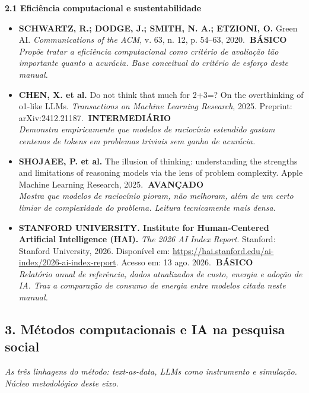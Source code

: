 \documentclass[11pt,a4paper]{article}
\newcommand{\refc}[2]{\item #1\\{\footnotesize\color{cinzaescuro}\textit{#2}}}
\newcommand{\nivelbasico}{\hfill\colorbox{verdeCodigo}{\color{white}\scriptsize\poppinsmed\textbf{~BÁSICO~}}}
\newcommand{\nivelinterm}{\hfill\colorbox{amareloSol}{\color{black}\scriptsize\poppinsmed\textbf{~INTERMEDIÁRIO~}}}
\newcommand{\nivelavancado}{\hfill\colorbox{laranjaDestaque}{\color{white}\scriptsize\poppinsmed\textbf{~AVANÇADO~}}}
\begin{document}
\textbf{\poppinsmed\color{azulUNIclaro}2.1 Eficiência computacional e sustentabilidade}
\begin{itemize}[leftmargin=1.4em,label={}]
\refc{\textbf{SCHWARTZ, R.; DODGE, J.; SMITH, N. A.; ETZIONI, O.} Green AI. \textit{Communications of the ACM}, v. 63, n. 12, p. 54--63, 2020.\nivelbasico}{Propõe tratar a eficiência computacional como critério de avaliação tão importante quanto a acurácia. Base conceitual do critério de esforço deste manual.}
\refc{\textbf{CHEN, X. et al.} Do not think that much for 2+3=? On the overthinking of o1-like LLMs. \textit{Transactions on Machine Learning Research}, 2025. Preprint: arXiv:2412.21187.\nivelinterm}{Demonstra empiricamente que modelos de raciocínio estendido gastam centenas de tokens em problemas triviais sem ganho de acurácia.}
\refc{\textbf{SHOJAEE, P. et al.} The illusion of thinking: understanding the strengths and limitations of reasoning models via the lens of problem complexity. Apple Machine Learning Research, 2025.\nivelavancado}{Mostra que modelos de raciocínio pioram, não melhoram, além de um certo limiar de complexidade do problema. Leitura tecnicamente mais densa.}
\refc{\textbf{STANFORD UNIVERSITY. Institute for Human-Centered Artificial Intelligence (HAI).} \textit{The 2026 AI Index Report}. Stanford: Stanford University, 2026. Disponível em: \url{https://hai.stanford.edu/ai-index/2026-ai-index-report}. Acesso em: 13 ago. 2026.\nivelbasico}{Relatório anual de referência, dados atualizados de custo, energia e adoção de IA. Traz a comparação de consumo de energia entre modelos citada neste manual.}
\end{itemize}

\subsection*{3. Métodos computacionais e IA na pesquisa social}
\textit{As três linhagens do método: text-as-data, LLMs como instrumento e simulação. Núcleo metodológico deste eixo.}
\end{document}
